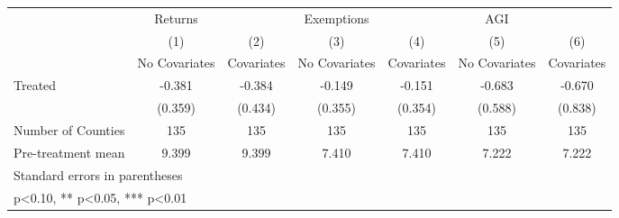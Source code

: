 {
\def\sym#1{\ifmmode^{#1}\else\(^{#1}\)\fi}
\begin{tabular}{l*{6}{c}}
\hline\hline
            &     Returns   &               &  Exemptions   &               &         AGI   &               \\
            &\multicolumn{1}{c}{(1)}&\multicolumn{1}{c}{(2)}&\multicolumn{1}{c}{(3)}&\multicolumn{1}{c}{(4)}&\multicolumn{1}{c}{(5)}&\multicolumn{1}{c}{(6)}\\
            &\multicolumn{1}{c}{No Covariates}&\multicolumn{1}{c}{Covariates}&\multicolumn{1}{c}{No Covariates}&\multicolumn{1}{c}{Covariates}&\multicolumn{1}{c}{No Covariates}&\multicolumn{1}{c}{Covariates}\\
\hline
Treated     &      -0.381   &      -0.384   &      -0.149   &      -0.151   &      -0.683   &      -0.670   \\
            &     (0.359)   &     (0.434)   &     (0.355)   &     (0.354)   &     (0.588)   &     (0.838)   \\
\hline
Number of Counties&         135   &         135   &         135   &         135   &         135   &         135   \\
Pre-treatment mean&       9.399   &       9.399   &       7.410   &       7.410   &       7.222   &       7.222   \\
\hline\hline
\multicolumn{7}{l}{\footnotesize Standard errors in parentheses}\\
\multicolumn{7}{l}{\footnotesize * p<0.10, ** p<0.05, *** p<0.01}\\
\end{tabular}
}
